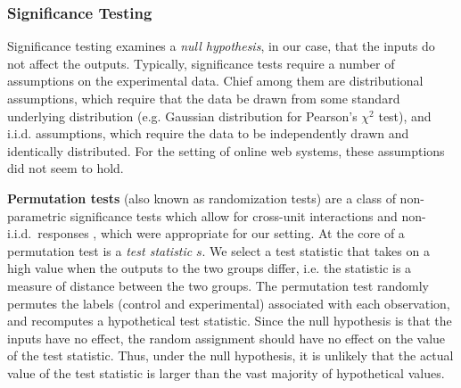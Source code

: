 \documentclass[10pt, onecolumn]{report}
\begin{document}
\subsubsection{Significance Testing}

Significance testing examines a \emph{null hypothesis}, in our case, 
that the inputs do not affect the outputs. 
Typically, significance tests require a number of assumptions on the experimental
data. Chief among them are distributional assumptions, which require that the data
be drawn from some standard underlying distribution (e.g. Gaussian distribution for
Pearson's $\chi^2$ test), and i.i.d. assumptions, which require the data to be 
independently drawn and identically distributed. For the setting of online web systems,
these assumptions did not seem to hold. 

\textbf{Permutation tests} (also known as {randomization tests}) are a class of 
non-parametric significance tests which allow for cross-unit interactions 
and non-i.i.d.\ responses \cite{good05book}, which were appropriate for our setting.
At the core of a permutation test is a \emph{test statistic} $s$.  
We select a test statistic that takes on a high value when the 
outputs to the two groups differ, i.e. the statistic is a measure of 
distance between the two groups.  
The permutation test randomly permutes the labels (control and experimental) 
associated with each observation, and recomputes a hypothetical test statistic.
Since the null hypothesis is that the inputs have no effect, 
the random assignment should have no effect on the value of the test statistic.
Thus, under the null hypothesis, it is unlikely that the actual value of 
the test statistic is larger than the vast majority of hypothetical values.
\end{document}
